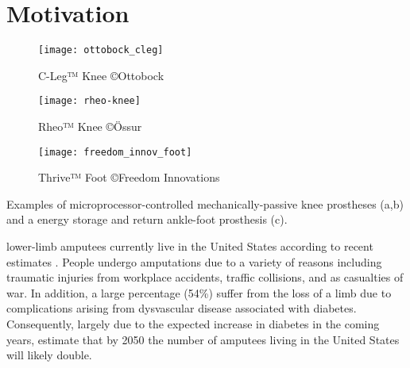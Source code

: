 \section{Motivation}\label{sec:intro_motivation}
\begin{marginfigure}[1in]
    \centering
	\begin{subfigure}[b]{\textwidth}
    	\centering
        \texttt{[image: ottobock\_cleg]}
        \caption{C-Leg™ Knee ©Ottobock}\label{fig:ottobock_cleg}
        \vspace{0.25in}
	\end{subfigure}
	\begin{subfigure}[b]{\textwidth}
    	\centering
        \texttt{[image: rheo-knee]}
        \caption{Rheo™  Knee ©Össur}\label{fig:ossur_rheo}
        \vspace{0.25in}
	\end{subfigure}
	\begin{subfigure}[b]{\textwidth}
    	\centering
        \texttt{[image: freedom\_innov\_foot]}
        \caption{Thrive™ Foot ©Freedom
        Innovations}\label{fig:freedom_innovations_foot}
	\end{subfigure}
    \caption[Examples of microprocessor-controlled mechanically-passive knee
    prostheses]{Examples of microprocessor-controlled mechanically-passive knee
    prostheses (a,b) and a energy storage and return ankle-foot prosthesis (c).}
\end{marginfigure}
 lower-limb amputees currently live in the
United States according to recent estimates \citep{ziegler2008estimating}.
People undergo amputations due to a variety of reasons including traumatic
injuries from workplace accidents, traffic collisions, and as casualties of war.
In addition, a large percentage (54\%) suffer from the loss of a limb due to
complications arising from dysvascular disease associated with diabetes.
Consequently, largely due to the expected increase in diabetes in the coming
years, \citet{ziegler2008estimating} estimate that by 2050 the number of
amputees living in the United States will likely double.

